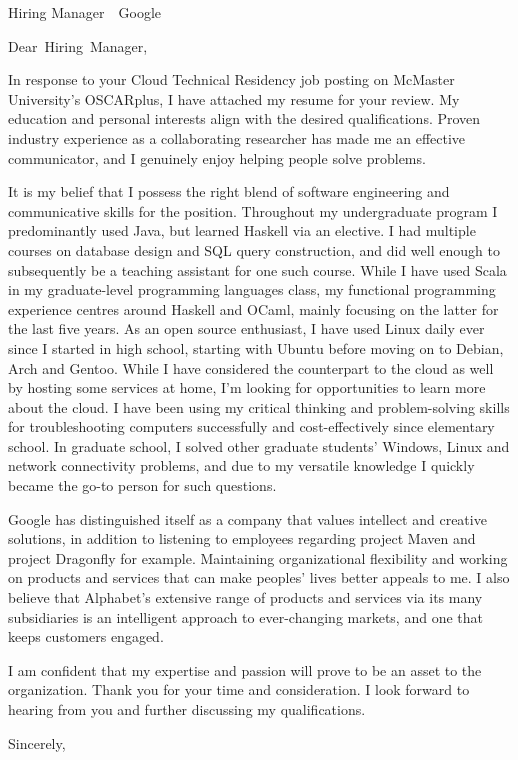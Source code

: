 \documentclass[
fontsize=12pt,
paper=letter,
parskip=half,
enlargefirstpage=on,    %
fromalign=right,        %
fromphone=on,           %
fromemail=on,
fromrule=aftername,     %
addrfield=off,           %
backaddress=off,         %
subject=beforeopening,  %
locfield=narrow,        %
foldmarks=off,           %
]{scrlttr2}
\renewcommand{\\}{\ {\large\textperiodcentered}\ }
\begin{document}

\begin{letter}{Hiring Manager\\Google}


\opening{Dear~Hiring~Manager,}

In response to your Cloud Technical Residency job posting on McMaster University's OSCARplus, I have attached my resume for your review.
My education and personal interests align with the desired qualifications.
Proven industry experience as a collaborating researcher has made me an effective communicator, and I genuinely enjoy helping people solve problems.

It is my belief that I possess the right blend of software engineering and communicative skills for the position.
Throughout my undergraduate program I predominantly used Java, but learned Haskell via an elective.
I had multiple courses on database design and SQL query construction, and did well enough to subsequently be a teaching assistant for one such course.
While I have used Scala in my graduate-level programming languages class, my functional programming experience centres around Haskell and OCaml, mainly focusing on the latter for the last five years.
As an open source enthusiast, I have used Linux daily ever since I started in high school, starting with Ubuntu before moving on to Debian, Arch and Gentoo.
While I have considered the counterpart to the cloud as well by hosting some services at home, I'm looking for opportunities to learn more about the cloud.
I have been using my critical thinking and problem-solving skills for troubleshooting computers successfully and cost-effectively since elementary school.
In graduate school, I solved other graduate students' Windows, Linux and network connectivity problems, and due to my versatile knowledge I quickly became the go-to person for such questions.

Google has distinguished itself as a company that values intellect and creative solutions, in addition to listening to employees regarding project Maven and project Dragonfly for example.
Maintaining organizational flexibility and working on products and services that can make peoples' lives better appeals to me.
I also believe that Alphabet's extensive range of products and services via its many subsidiaries is an intelligent approach to ever-changing markets, and one that keeps customers engaged.

I am confident that my expertise and passion will prove to be an asset to the organization.
Thank you for your time and consideration.
I look forward to hearing from you and further discussing my qualifications.
\closing{Sincerely,}


\end{letter}
\end{document}
